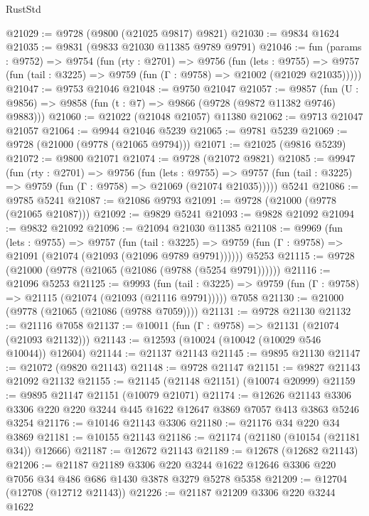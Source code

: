 \begin{lexlean}{RustStd}
\begin{coremodule}
{\begin{coremodule}
{{{{{{{{{{{{{{{{{{{{{{{{{{@21029 := @9728 (@9800 (@21025 @9817) @9821)
@21030 := @9834 @1624
@21035 := @9831 (@9833 @21030 @11385 @9789 @9791)
@21046 := fun (params : @9752) =>
  @9754
    (fun (rty : @2701) =>
    @9756
      (fun (lets : @9755) =>
      @9757 (fun (tail : @3225) => @9759 (fun (Γ : @9758) => @21002 (@21029 @21035)))))
@21047 := @9753 @21046
@21048 := @9750 @21047
@21057 := @9857
    (fun (U : @9856) => @9858 (fun (t : @7) => @9866 (@9728 (@9872 @11382 @9746) @9883)))
@21060 := @21022 (@21048 @21057) @11380
@21062 := @9713 @21047 @21057
@21064 := @9944 @21046 @5239
@21065 := @9781 @5239
@21069 := @9728 (@21000 (@9778 (@21065 @9794)))
@21071 := @21025 (@9816 @5239)
@21072 := @9800 @21071
@21074 := @9728 (@21072 @9821)
@21085 := @9947
    (fun (rty : @2701) =>
    @9756
      (fun (lets : @9755) =>
      @9757 (fun (tail : @3225) => @9759 (fun (Γ : @9758) => @21069 (@21074 @21035)))))
    @5241
@21086 := @9785 @5241
@21087 := @21086 @9793
@21091 := @9728 (@21000 (@9778 (@21065 @21087)))
@21092 := @9829 @5241
@21093 := @9828 @21092
@21094 := @9832 @21092
@21096 := @21094 @21030 @11385
@21108 := @9969
    (fun (lets : @9755) =>
    @9757
      (fun (tail : @3225) =>
      @9759 (fun (Γ : @9758) => @21091 (@21074 (@21093 (@21096 @9789 @9791))))))
    @5253
@21115 := @9728 (@21000 (@9778 (@21065 (@21086 (@9788 (@5254 @9791))))))
@21116 := @21096 @5253
@21125 := @9993
    (fun (tail : @3225) => @9759 (fun (Γ : @9758) => @21115 (@21074 (@21093 (@21116 @9791)))))
    @7058
@21130 := @21000 (@9778 (@21065 (@21086 (@9788 @7059))))
@21131 := @9728 @21130
@21132 := @21116 @7058
@21137 := @10011 (fun (Γ : @9758) => @21131 (@21074 (@21093 @21132)))
@21143 := @12593 (@10024 (@10042 (@10029 @546 @10044)) @12604)
@21144 := @21137 @21143
@21145 := @9895 @21130
@21147 := @21072 (@9820 @21143)
@21148 := @9728 @21147
@21151 := @9827 @21143 @21092 @21132
@21155 := @21145 (@21148 @21151) (@10074 @20999)
@21159 := @9895 @21147 @21151 (@10079 @21071)
@21174 := @12626
    @21143
    @3306
    @3306
    @220
    @220
    @3244
    @445
    @1622
    @12647
    @3869
    @7057
    @413
    @3863
    @5246
    @3254
@21176 := @10146 @21143 @3306
@21180 := @21176 @34 @220 @34 @3869
@21181 := @10155 @21143
@21186 := @21174 (@21180 (@10154 (@21181 @34)) @12666)
@21187 := @12672 @21143
@21189 := @12678 (@12682 @21143)
@21206 := @21187
    @21189
    @3306
    @220
    @3244
    @1622
    @12646
    @3306
    @220
    @7056
    @34
    @486
    @686
    @1430
    @3878
    @3279
    @5278
    @5358
@21209 := @12704 (@12708 (@12712 @21143))
@21226 := @21187
    @21209
    @3306
    @220
    @3244
    @1622
}}}}}}}}}}}}}}}}}}}}}}}}}}
\end{coremodule}}
\end{coremodule}
\end{lexlean}
